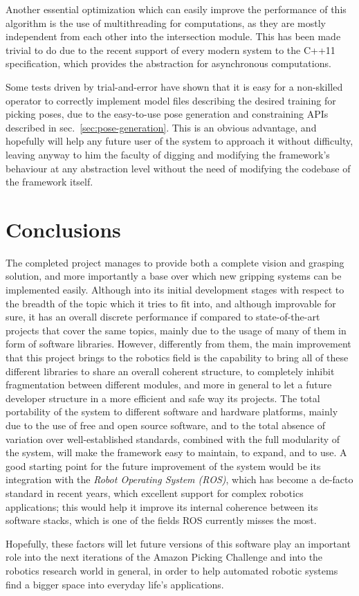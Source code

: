 Another essential optimization which can easily improve the
performance of this algorithm is the use of multithreading for
computations, as they are mostly independent from each other into the
intersection module. This has been made trivial to do due to the
recent support of every modern system to the C++11 specification,
which provides the  abstraction for asynchronous computations.

Some tests driven by trial-and-error have shown that it is easy for a
non-skilled operator to correctly implement model files describing the
desired training for picking poses, due to the easy-to-use pose
generation and constraining APIs described in
sec.~\ref{sec:pose-generation}. This is an obvious advantage, and
hopefully will help any future user of the system to approach it
without difficulty, leaving anyway to him the faculty of digging and
modifying the framework's behaviour at any abstraction level without
the need of modifying the codebase of the framework itself.

\section{Conclusions}
The completed project manages to provide both a complete vision and
grasping solution, and more importantly a base over which new gripping
systems can be implemented easily. Although into its initial
development stages with respect to the breadth of the topic which it
tries to fit into, and although improvable for sure, it has an overall
discrete performance if compared to 
state-of-the-art projects that cover the same topics, mainly due to the usage of
many of them in form of software libraries. However, differently from
them, the main improvement that this project brings to the robotics
field is the capability to bring all of these different libraries to
share an overall coherent structure, to completely inhibit fragmentation between
different modules, and more in general to let a future developer
structure in a more efficient and safe way its projects. The total
portability of the system to different software and hardware
platforms, mainly due to the use of free and open source software, and
to the total absence of variation over well-established standards,
combined with the full modularity of the system, will
make the framework easy to maintain, to expand, and to use. A good
starting point for the future improvement of the system would be its
integration with the \emph{Robot Operating System (\emph{ROS})}, which
has become a de-facto standard in recent years, which excellent
support for complex robotics applications; this would help it improve
its internal coherence between its software stacks, which is one of
the fields ROS currently misses the most.

Hopefully, these factors will let future versions of this software play an
important role into the next iterations of the Amazon Picking
Challenge and into the robotics research world in general, in order to help
automated robotic systems find a bigger space into everyday life's applications.
